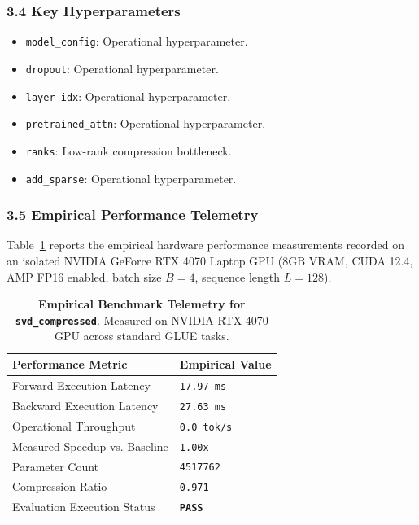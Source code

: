 \subsubsection*{3.4 Key Hyperparameters}
\begin{itemize}
    \item \texttt{model\_config}: Operational hyperparameter.
    \item \texttt{dropout}: Operational hyperparameter.
    \item \texttt{layer\_idx}: Operational hyperparameter.
    \item \texttt{pretrained\_attn}: Operational hyperparameter.
    \item \texttt{ranks}: Low-rank compression bottleneck.
    \item \texttt{add\_sparse}: Operational hyperparameter.
\end{itemize}

\subsubsection*{3.5 Empirical Performance Telemetry}
Table~\ref{tab:telemetry_svd\_compressed} reports the empirical hardware performance measurements recorded on an isolated NVIDIA GeForce RTX 4070 Laptop GPU (8GB VRAM, CUDA 12.4, AMP FP16 enabled, batch size $B=4$, sequence length $L=128$).

\begin{table}[h]
\centering
\small
\caption{\textbf{Empirical Benchmark Telemetry for \texttt{svd\_compressed}}. Measured on NVIDIA RTX 4070 GPU across standard GLUE tasks.}
\label{tab:telemetry_svd\_compressed}
\begin{tabularx}{\columnwidth}{lX}
\toprule
\textbf{Performance Metric} & \textbf{Empirical Value} \\
\midrule
Forward Execution Latency & \texttt{17.97 ms} \\
Backward Execution Latency & \texttt{27.63 ms} \\
Operational Throughput & \texttt{0.0 tok/s} \\
Measured Speedup vs. Baseline & \texttt{1.00x} \\
Parameter Count & \texttt{4517762} \\
Compression Ratio & \texttt{0.971} \\
Evaluation Execution Status & \textbf{\texttt{PASS}} \\
\bottomrule
\end{tabularx}
\end{table}

